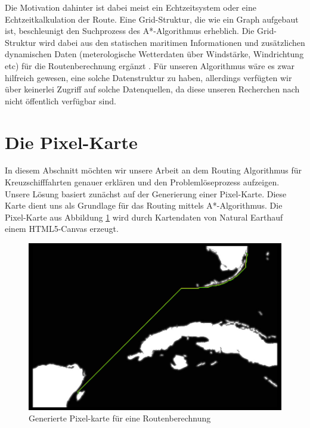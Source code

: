 \documentclass[letterpaper]{article}
\begin{document}
	Die Motivation dahinter ist dabei meist ein Echtzeitsystem oder eine Echtzeitkalkulation der Route. Eine Grid-Struktur, die wie ein Graph aufgebaut ist, beschleunigt den Suchprozess des A*-Algorithmus erheblich\cite{patel16}. Die Grid-Struktur wird dabei aus den statischen maritimen Informationen und zusätzlichen dynamischen Daten (meterologische Wetterdaten über Windstärke, Windrichtung etc) für die Routenberechnung ergänzt \cite[s. 2]{makrygiorgos15}.
	Für unseren Algorithmus wäre es zwar hilfreich gewesen, eine solche Datenstruktur zu haben, allerdings verfügten wir über keinerlei Zugriff auf solche Datenquellen, da diese unseren Recherchen nach nicht öffentlich verfügbar sind.

\section{Die Pixel-Karte}
	In diesem Abschnitt möchten wir unsere Arbeit an dem Routing Algorithmus für Kreuzschifffahrten genauer erklären und den Problemlöseprozess aufzeigen. Unsere Lösung basiert zunächst auf der Generierung einer Pixel-Karte. Diese Karte dient uns als Grundlage für das Routing mittels A*-Algorithmus. Die Pixel-Karte aus Abbildung \ref{fig:Pixel Map Miami} wird durch Kartendaten von Natural Earth\footnotemark auf einem HTML5-Canvas erzeugt. 


	\begin{figure}[!htbp]
		\centering
		\includegraphics[width=\linewidth]{pixel_map_miami}
		\caption{Generierte Pixel-karte für eine Routenberechnung}
		\label{fig:Pixel Map Miami}
	\end{figure}
\end{document}
